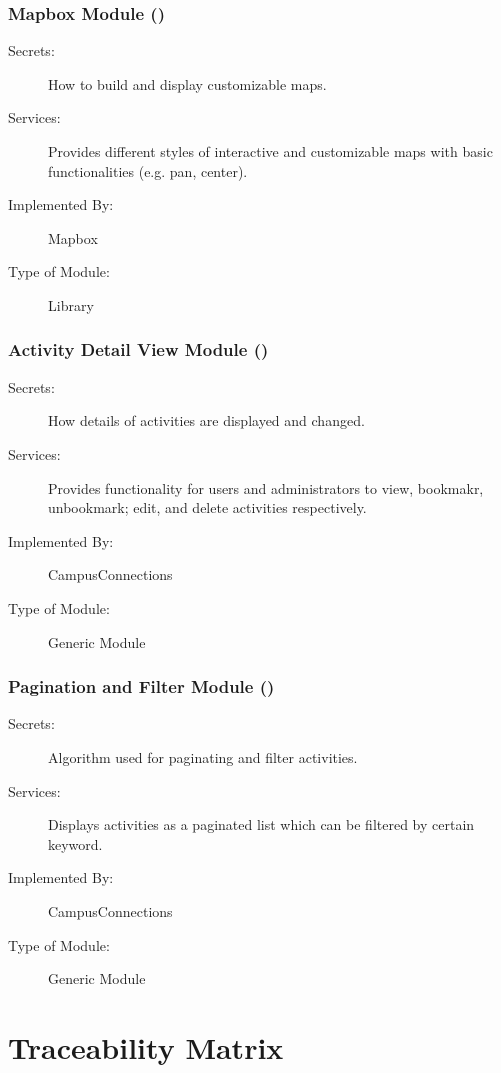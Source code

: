 \documentclass[12pt, titlepage]{article}
\begin{document}
  \subsubsection{Mapbox Module (\label{mMap})}
  \begin{description}
  \item[Secrets:]How to build and display customizable maps.
  \item[Services:]Provides different styles of interactive and customizable maps with basic functionalities (e.g. pan, center).
  \item[Implemented By:] Mapbox
  \item[Type of Module:] Library
  \end{description}
  
  \subsubsection{Activity Detail View Module (\label{mADV})}
  \begin{description}
    \item[Secrets:]How details of activities are displayed and changed.
    \item[Services:]Provides functionality for users and administrators to view, bookmakr, unbookmark; edit, and delete activities respectively.
    \item[Implemented By:] CampusConnections
    \item[Type of Module:] Generic Module
  \end{description}
  
  \subsubsection{Pagination and Filter Module (\label{mPF})}
  \begin{description}
    \item[Secrets:]Algorithm used for paginating and filter activities.
    \item[Services:]Displays activities as a paginated list which can be filtered by certain keyword.
    \item[Implemented By:] CampusConnections
    \item[Type of Module:] Generic Module
  \end{description}

\section{Traceability Matrix} \label{SecTM}
\end{document}
